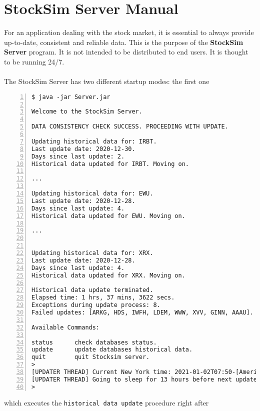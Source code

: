 \chapter{StockSim Server Manual}
For an application dealing with the stock market, it is essential to 
always provide up-to-date, consistent and reliable data. This is the purpose of 
the \textbf{StockSim Server} program. It is not intended to be distributed to 
end users. It is thought to be running 24/7.\\
\\
The StockSim Server has two different startup modes: the first one
\begin{lstlisting}[basicstyle=\footnotesize\ttfamily,language={},numbers=left,
numberstyle=\footnotesize,numbersep=8pt,frame=single]
$ java -jar Server.jar

Welcome to the StockSim Server.

DATA CONSISTENCY CHECK SUCCESS. PROCEEDING WITH UPDATE.

Updating historical data for: IRBT.
Last update date: 2020-12-30.
Days since last update: 2.
Historical data updated for IRBT. Moving on.

...

Updating historical data for: EWU.
Last update date: 2020-12-28.
Days since last update: 4.
Historical data updated for EWU. Moving on.

...


Updating historical data for: XRX.
Last update date: 2020-12-28.
Days since last update: 4.
Historical data updated for XRX. Moving on.

Historical data update terminated.
Elapsed time: 1 hrs, 37 mins, 3622 secs.
Exceptions during update process: 8.
Failed updates: [ARKG, HDS, IWFH, LDEM, WWW, XVV, GINN, AAAU].

Available Commands:

status		check databases status.
update		update databases historical data.
quit		quit Stocksim server.
> 
[UPDATER THREAD] Current New York time: 2021-01-02T07:50-[America/New_York]
[UPDATER THREAD] Going to sleep for 13 hours before next update.
> 
\end{lstlisting}
\vspace{-0.5cm}
which executes the \texttt{historical data update} procedure right after
